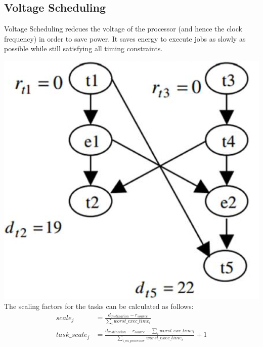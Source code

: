 	\subsection{Voltage Scheduling}	
		Voltage Scheduling redcues the voltage of the processor (and hence the clock frequency) in order to save power. It saves energy to execute jobs as slowly as possible while still satisfying all timing constraints. 
		\begin{multicols}{2}
			\includegraphics[scale=0.75]{./pictures/voltage_scheduling_bindings.png} \\
			The scaling factors for the tasks can be calculated as follows: \\
			\begin{equation*}
				\begin{aligned}
					scale_j&=\frac{d_{destination}-r_{source}}{\sum_{i}worst\_exec\_time_i} \\
					task\_scale_j&=\frac{d_{destination}-r_{source}-\sum_{i}worst\_exe\_time_i}{\sum_{i\_on\_processor}worst\_exec\_time_i}+1 \\
				\end{aligned}
			\end{equation*}
		\end{multicols}
	
